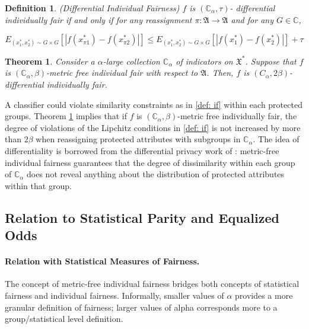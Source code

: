 \documentclass{article}
\newtheorem{thm}{Theorem}[section]
\newtheorem{defn}{Definition}[section]
\begin{document}
 \begin{defn} (Differential Individual Fairness)
 \label{def: dif}
 $f$ is $(\mathbb{C}_{\alpha}, \tau)$- differential individually fair if and only if for any reassignment $\pi: \mathfrak{A} \rightarrow \mathfrak{A}$ and for any $G \in \mathbb{C}$,
 
 $$  E_{(x^{*}_{1}, x_{2}^{*})\sim G\times G}\left[\left|f(x_{\pi1}^{*}) - f(x_{\pi2}^{*})\right|\right] \leq E_{(x^{*}_{1}, x_{2}^{*})\sim G\times G}\left[\left|f(x_{1}^{*}) - f(x_{2}^{*})\right|\right] + \tau $$
 \end{defn}
 
 
 \begin{thm}
 \label{thm: dif}
 Consider a $\alpha$-large collection $\mathbb{C}_{\alpha}$ of indicators on $\mathfrak{X}^{*}$. Suppose that $f$ is $(\mathbb{C}_{\alpha}, \beta)$-metric free individual fair with respect to $\mathfrak{A}$. Then, $f$ is $(C_{\alpha}, 2\beta)$-differential individually fair.
 \end{thm}
 
 A classifier could violate similarity constraints as in \ref{def: if} within each protected groups. Theorem \ref{thm: dif} implies that if $f$ is $(\mathbb{C}_{\alpha}, \beta)$-metric free individually fair, the degree of violations of the Lipchitz conditions in \ref{def: if} is not increased by more than $2\beta$ when reassigning protected attributes with subgroups in $\mathbb{C}_{\alpha}$. The idea of differentiality is borrowed from the differential privacy work of :  metric-free individual fairness guarantees that the degree of dissimilarity within each group of $\mathbb{C}_{\alpha}$ does not reveal anything about the distribution of protected attributes within that group. 

\subsection{Relation to Statistical Parity and Equalized Odds}

\paragraph{Relation with Statistical Measures of Fairness.}
The concept of metric-free individual fairness bridges both concepts of statistical fairness and individual fairness.  Informally, smaller values of $\alpha$ provides a more granular definition of fairness; larger values of alpha corresponds more to a group/statistical level definition. 
\end{document}
